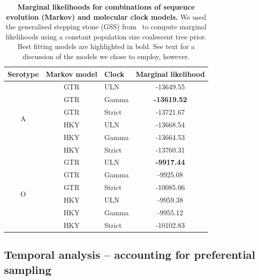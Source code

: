 \documentclass[a4paper,10pt]{article}
\begin{document}
\begin{table}[!ht]
\caption{\textbf{Marginal likelihoods for combinations of sequence evolution (Markov) and molecular clock models.}
We used the generalised stepping stone (GSS) from~\cite{M-Baele2015} to compute marginal likelihoods using a constant population size coalescent tree prior.
Best fitting models are highlighted in bold.
See text for a discussion of the models we chose to employ, however.
}
\begin{center}
 \begin{tabular}{cclc}
\hline
Serotype & Markov model & Clock & Marginal likelihood \\
\hline
\multirow{6}{*}{A} & GTR & ULN & -13649.55 \\
 & GTR & Gamma & \textbf{-13619.52} \\
 & GTR & Strict & -13721.67 \\
 & HKY & ULN & -13668.54 \\
 & HKY & Gamma & -13664.53 \\
 & HKY & Strict & -13760.31 \\
 \hline
\multirow{6}{*}{O}& GTR & \multicolumn{1}{l}{ULN} & \textbf{-9917.44} \\
\multicolumn{1}{l}{} & GTR & \multicolumn{1}{l}{Gamma} & -9925.08 \\
\multicolumn{1}{l}{} & GTR & \multicolumn{1}{l}{Strict} & -10085.06 \\
\multicolumn{1}{l}{} & HKY & \multicolumn{1}{l}{ULN} & -9959.38 \\
\multicolumn{1}{l}{} & HKY & \multicolumn{1}{l}{Gamma} & -9955.12 \\
\multicolumn{1}{l}{} & HKY & \multicolumn{1}{l}{Strict} & -10102.83\\
\hline
\end{tabular}
\end{center}
\label{stab:treeclockselection}
\end{table}
\newpage

\subsection*{Temporal analysis -- accounting for preferential sampling}
\end{document}
